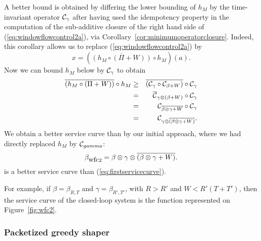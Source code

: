 A better bound is obtained by differing the lower bounding of $h_{M}$ by the time-invariant operator $\mathcal C_{\gamma}$ after having used the idempotency property in the
computation of the sub-additive closure of the right hand side of (\ref{eq:windowflowcontrol2a}),
via Corollary~\ref{cor:minimumoperatorclosure}. Indeed, this corollary allows us to replace
(\ref{eq:windowflowcontrol2a}) by
$$ x = \left( \overline{ \left(  h_{M} \circ \left( \Pi + W \right) \right) } \circ h_M \right) (a). $$
Now we can bound $h_M$ below by $\mathcal C_\gamma$ to obtain
\begin{eqnarray*}
 \overline{ \left(  h_{M} \circ \left( \Pi + W \right) \right) } \circ h_M
  & \geq &  \overline{ (\mathcal C_{\gamma} \circ \mathcal C_{\beta + W})}  \circ \mathcal C_{\gamma} \\
     & = &  \overline{ \mathcal C }_{ \gamma \otimes (\beta + W) }   \circ \mathcal C_{\gamma} \\
  & = & \mathcal C_{ \overline{\beta \otimes \gamma + W } } \circ \mathcal C_{\gamma} \\
  & = & \mathcal C_{ \gamma \otimes \overline{(\beta \otimes \gamma + W) } }.
\end{eqnarray*}
We obtain a better service curve than by our initial approach, where we had directly replaced $h_M$ by $\mathcal C_{gamma}$:
\begin{equation}
\mylabel{eq:secondservicecurve}
 \beta_{\mbox{wfc}2} = \beta \otimes \gamma \otimes \overline { (\beta \otimes \gamma + W)  }.
\end{equation}
is a better service curve than (\ref{eq:firstservicecurve}).

For example, if $\beta = \beta_{R,T}$ and $\gamma = \beta_{R',T'}$, with $R > R'$ and $W < R'(T+T')$, then the service curve of the closed-loop system is the function represented on Figure~\ref{fig:wfc2}.

\begin{figure}[!h]
    \protect{}
\end{figure}

\subsubsection{Packetized greedy shaper}

